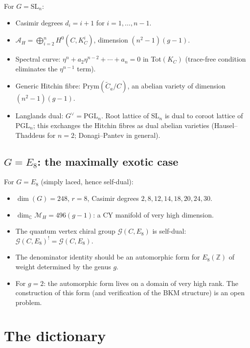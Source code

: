 \documentclass[11pt]{article}
\theoremstyle{definition}
\theoremstyle{remark}
\newcommand{\cA}{\mathcal{A}}
\newcommand{\cM}{\mathcal{M}}
\newcommand{\Prym}{\mathrm{Prym}}
\begin{document}
For $G = \mathrm{SL}_n$:
\begin{itemize}
 \item Casimir degrees $d_i = i+1$ for $i = 1, \ldots, n-1$.
 \item $\cA_H = \bigoplus_{i=2}^n H^0(C, K_C^i)$, dimension $(n^2-1)(g-1)$.
 \item Spectral curve: $\eta^n + a_2\eta^{n-2} + \cdots + a_n = 0$ in Tot$(K_C)$ (trace-free condition eliminates the $\eta^{n-1}$ term).
 \item Generic Hitchin fibre: $\Prym(\widetilde{C}_a / C)$, an abelian variety of dimension $(n^2-1)(g-1)$.
 \item Langlands dual: $G^\vee = \mathrm{PGL}_n$. Root lattice of $\mathrm{SL}_n$ is dual to coroot lattice of $\mathrm{PGL}_n$; this exchanges the Hitchin fibres as dual abelian varieties (Hausel--Thaddeus for $n = 2$; Donagi--Pantev in general).
\end{itemize}

\subsection{$G = E_8$: the maximally exotic case}

For $G = E_8$ (simply laced, hence self-dual):
\begin{itemize}
 \item $\dim(G) = 248$, $r = 8$, Casimir degrees $2, 8, 12, 14, 18, 20, 24, 30$.
 \item $\dim_\mathbb{C} \cM_H = 496(g-1)$: a CY manifold of very high dimension.
 \item The quantum vertex chiral group $\mathcal{G}(C, E_8)$ is self-dual: $\mathcal{G}(C, E_8)^! = \mathcal{G}(C, E_8)$.
 \item The denominator identity should be an automorphic form for $E_8(\mathbb{Z})$ of weight determined by the genus $g$.
 \item For $g = 2$: the automorphic form lives on a domain of very high rank. The construction of this form (and verification of the BKM structure) is an open problem.
\end{itemize}


\section{The dictionary}
\label{sec:dictionary}
\end{document}
